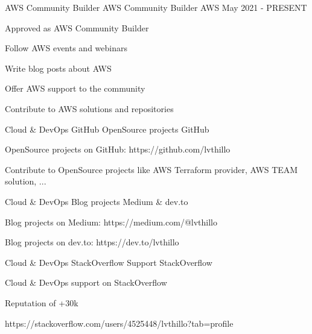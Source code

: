 \newpage
{}


\begin{cventries}

  \cventry
    {AWS Community Builder} %
    {AWS Community Builder} %
    {AWS} %
    {May 2021 - PRESENT} %
    {
      \begin{cvitems} %
        \item {Approved as AWS Community Builder}
        \item {Follow AWS events and webinars}
        \item {Write blog posts about AWS}
        \item {Offer AWS support to the community}
        \item {Contribute to AWS solutions and repositories}
      \end{cvitems}
    }

  \cventry
    {Cloud \& DevOps} %
    {GitHub OpenSource projects} %
    {GitHub} %
    {} %
    {
      \begin{cvitems} %
        \item {OpenSource projects on GitHub: https://github.com/lvthillo}
        \item {Contribute to OpenSource projects like AWS Terraform provider, AWS TEAM solution, ...}
      \end{cvitems}
    }

  \cventry
    {Cloud \& DevOps} %
    {Blog projects} %
    {Medium \& dev.to} %
    {} %
    {
      \begin{cvitems} %
        \item {Blog projects on Medium: https://medium.com/@lvthillo}
        \item {Blog projects on dev.to: https://dev.to/lvthillo}
      \end{cvitems}
    }

  \cventry
    {Cloud \& DevOps} %
    {StackOverflow Support} %
    {StackOverflow} %
    {} %
    {
      \begin{cvitems} %
        \item {Cloud \& DevOps support on StackOverflow}
        \item {Reputation of +30k}
        \item {https://stackoverflow.com/users/4525448/lvthillo?tab=profile}
      \end{cvitems}
    }


\end{cventries}
